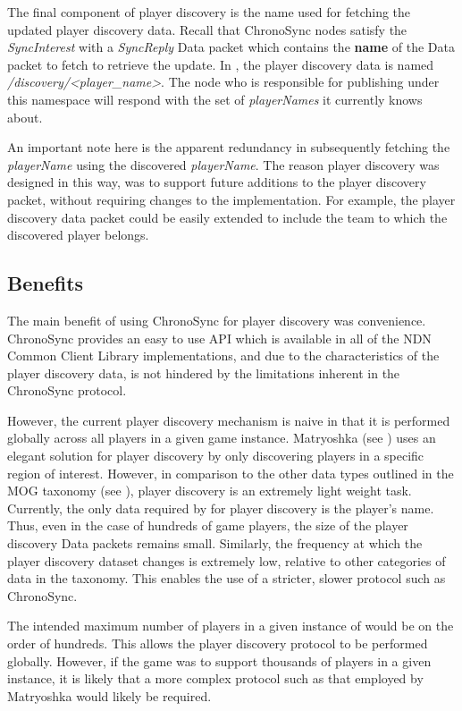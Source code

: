 \sloppy The final component of player discovery is the name used for fetching the updated player discovery data. Recall that ChronoSync nodes satisfy the \textit{SyncInterest} with a \textit{SyncReply} Data packet which contains the \textbf{name} of the Data packet to fetch to retrieve the update. In \game{}, the player discovery data is named \textit{\gameprefix{}/discovery/<player\_name>}. The node who is responsible for publishing under this namespace will respond with the set of \textit{playerNames} it currently knows about.

An important note here is the apparent redundancy in subsequently fetching the \textit{playerName} using the discovered \textit{playerName}. The reason player discovery was designed in this way, was to support future additions to the player discovery packet, without requiring changes to the implementation. For example, the player discovery data packet could be easily extended to include the team to which the discovered player belongs.

\subsection{Benefits}
The main benefit of using ChronoSync for player discovery was convenience. ChronoSync provides an easy to use API which is available in all of the NDN Common Client Library implementations, and due to the characteristics of the player discovery data, \game{} is not hindered by the limitations inherent in the ChronoSync protocol.

However, the current player discovery mechanism is naive in that it is performed globally across all players in a given game instance. Matryoshka (see ) uses an elegant solution for player discovery by only discovering players in a specific region of interest. However, in comparison to the other data types outlined in the MOG taxonomy (see ), player discovery is an extremely light weight task. Currently, the only data required by \game{} for player discovery is the player's name. Thus, even in the case of hundreds of game players, the size of the player discovery Data packets remains small. Similarly, the frequency at which the player discovery dataset changes is extremely low, relative to other categories of data in the taxonomy. This enables the use of a stricter, slower protocol such as ChronoSync.

The intended maximum number of players in a given instance of \game{} would be on the order of hundreds. This allows the player discovery protocol to be performed globally. However, if the game was to support thousands of players in a given instance, it is likely that a more complex protocol such as that employed by Matryoshka would likely be required.


